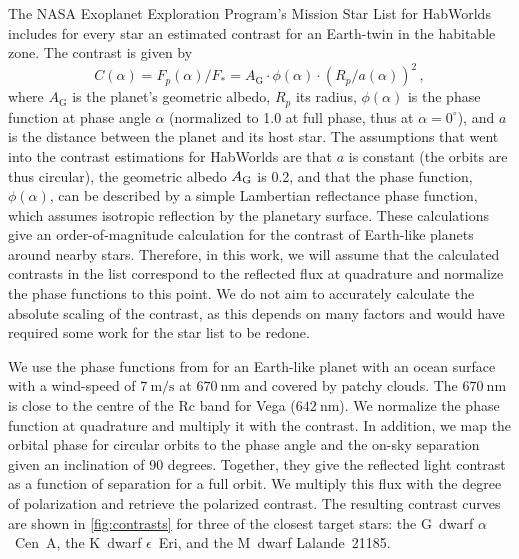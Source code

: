\documentclass[
    usenatbib,
]{mnras}
\newcommand{\hwo}{HabWorlds}
\begin{document}
The NASA Exoplanet Exploration Program’s Mission Star List for \hwo{} 
includes for every star an estimated contrast for an Earth-twin in 
the habitable zone.
%
The contrast is given by \citep[see, e.g.,][]{2023A&A...671A.165M}
\begin{equation}
    C(\alpha) 
    = F_p(\alpha) / F_* 
    = A_\mathrm{G} \cdot \phi(\alpha) \cdot \left( R_p / a(\alpha) \right)^2 \,,
\label{eq:contrast}
\end{equation}
where $A_\mathrm{G}$ is the planet's geometric albedo, $R_p$ its radius, $\phi(\alpha)$ is the phase function at phase angle $\alpha$
(normalized to \num{1.0} at full phase, thus at $\alpha=0^\circ$), 
and $a$ is the distance between the planet and its host star.
%
The assumptions that went into the contrast estimations for \hwo{}
are that $a$ is constant (the orbits are thus circular), the geometric albedo $A_{\rm G}$ is \num{0.2}, and that the phase function, $\phi(\alpha)$, can be described by a simple Lambertian reflectance phase function, which assumes isotropic reflection by the planetary surface.
%
These calculations give an order-of-magnitude calculation for the 
contrast of Earth-like planets around nearby stars.
%
Therefore, in this work, we will assume that the calculated contrasts 
in the list correspond to the reflected flux at quadrature and normalize the phase functions to this point.
%
We do not aim to accurately calculate the absolute scaling of the contrast, as this depends on many factors and would have required some work for the star list to be redone.
%

We use the phase functions from \citet{treesandstam2019} 
for an Earth-like planet with an ocean surface with a wind-speed of $\qty{7}{\meter\per\second}$ at $\qty{670}{\nano\meter}$ and covered by patchy clouds.
%
The $\qty{670}{\nano\meter}$ is close to the centre of the Rc band for Vega ($\qty{642}{\nano\meter}$). 
%
We normalize the phase function at quadrature and multiply it with the 
contrast.
%
In addition, we map the orbital phase for circular orbits to the phase angle and the on-sky separation given an inclination of \num{90} degrees.
%
Together, they give the reflected light contrast as a function of separation for a full orbit.
%
We multiply this flux with the degree of polarization and retrieve the polarized contrast.
%
The resulting contrast curves are shown in \cref{fig:contrasts} for 
three of the closest target stars: the G~dwarf $\alpha$~Cen~A, the K~dwarf 
$\epsilon$~Eri, and the M~dwarf Lalande~21185.
\end{document}
